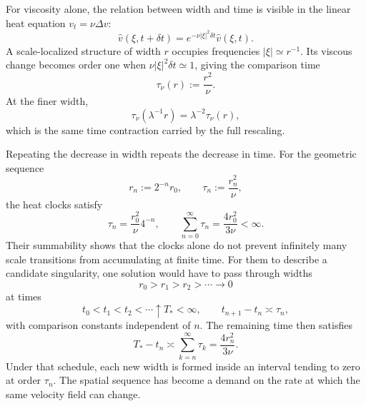 
For viscosity alone, the relation between width and time is visible in the linear heat equation \(v_t=\nu\Delta v\):
\[
  \widehat v(\xi,t+\delta t)
  =
  e^{-\nu|\xi|^2\delta t}\widehat v(\xi,t).
\]
A scale-localized structure of width \(r\) occupies frequencies \(|\xi|\simeq r^{-1}\).
Its viscous change becomes order one when \(\nu|\xi|^2\delta t\simeq1\), giving the comparison time
\[
  \tau_\nu(r)
  :=
  \frac{r^2}{\nu}.
\]
At the finer width,
\[
  \tau_\nu(\lambda^{-1}r)
  =
  \lambda^{-2}\tau_\nu(r),
\]
which is the same time contraction carried by the full \NavierStokes{} rescaling.


Repeating the decrease in width repeats the decrease in time.
For the geometric sequence
\[
  r_n:=2^{-n}r_0,
  \qquad
  \tau_n:=\frac{r_n^2}{\nu},
\]
the heat clocks satisfy
\[
  \tau_n
  =
  \frac{r_0^2}{\nu}4^{-n},
  \qquad
  \sum_{n=0}^{\infty}\tau_n
  =
  \frac{4r_0^2}{3\nu}
  <
  \infty.
\]
Their summability shows that the clocks alone do not prevent infinitely many scale transitions from accumulating at finite time.
For them to describe a candidate singularity, one \NavierStokes{} solution would have to pass through widths
\[
  r_0>r_1>r_2>\cdots\longrightarrow0
\]
at times
\[
  t_0<t_1<t_2<\cdots\uparrow T_*<\infty,
  \qquad
  t_{n+1}-t_n\asymp\tau_n,
\]
with comparison constants independent of \(n\).
The remaining time then satisfies
\[
  T_*-t_n
  \asymp
  \sum_{k=n}^{\infty}\tau_k
  =
  \frac{4r_n^2}{3\nu}.
\]
Under that schedule, each new width is formed inside an interval tending to zero at order \(\tau_n\).
The spatial sequence has become a demand on the rate at which the same velocity field can change.
